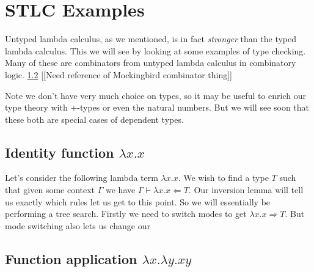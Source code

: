 \section{STLC Examples}

%


Untyped lambda calculus, as we mentioned, is in fact \emph{stronger} than the typed lambda calculus. This we will see by looking at some examples of type checking. Many of these are combinators from untyped lambda calculus in combinatory logic. \ref{} [[Need reference of Mockingbird combinator thing]]

Note we don't have very much choice on types, so it may be useful to enrich our type theory with $+$-types or even the natural numbers. But we will see soon that these both are special cases of dependent types.

\subsection{Identity function $\lambda x . x$}

\begin{example}
    Let's consider the following lambda term $\lambda x . x$. We wish to find a type $T$ such that given some context $\Gamma$ we have $\Gamma \vdash \lambda x . x \Leftarrow T$. Our inversion lemma will tell us exactly which rules let us get to this point. So we will essentially be performing a tree search. Firstly we need to switch modes to get $\lambda x . x \Rightarrow T$. But mode switching also lets us change our 
    \begin{prooftree}
    \end{prooftree}
\end{example}

\subsection{Function application $\lambda x . \lambda y . x y$}

